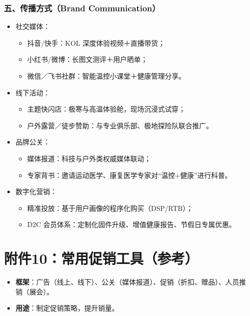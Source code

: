 \documentclass[UTF8]{report}
\theoremstyle{MyLineTheoremStyle} %
\theoremstyle{MyBlockTheoremStyle} %
\theoremstyle{MySubsubsectionStyle} %
\begin{document}
  \subsubsection{五、传播方式（Brand Communication）}
    \begin{itemize}
      \item 社交媒体：  
        \begin{itemize}
          \item 抖音/快手：KOL 深度体验视频＋直播带货；  
          \item 小红书/微博：长图文测评＋用户晒单；  
          \item 微信／飞书社群：智能温控小课堂＋健康管理分享。  
        \end{itemize}
      \item 线下活动：  
        \begin{itemize}
          \item 主题快闪店：极寒与高温体验舱，现场沉浸式试穿；  
          \item 户外露营／徒步赞助：与专业俱乐部、极地探险队联合推广。  
        \end{itemize}
      \item 品牌公关：  
        \begin{itemize}
          \item 媒体报道：科技与户外类权威媒体联动；  
          \item 专家背书：邀请运动医学、康复医学专家对“温控+健康”进行科普。  
        \end{itemize}
      \item 数字化营销：  
        \begin{itemize}
          \item 精准投放：基于用户画像的程序化购买（DSP/RTB）；  
          \item D2C 会员体系：定制化固件升级、增值健康报告、节假日专属优惠。
        \end{itemize}
    \end{itemize}

\section{附件10：常用促销工具（参考）}
\begin{itemize}
    \item \textbf{框架}：广告（线上、线下）、公关（媒体报道）、促销（折扣、赠品）、人员推销（展会）。
    \item \textbf{用途}：制定促销策略，提升销量。
\end{itemize}
\end{document}
